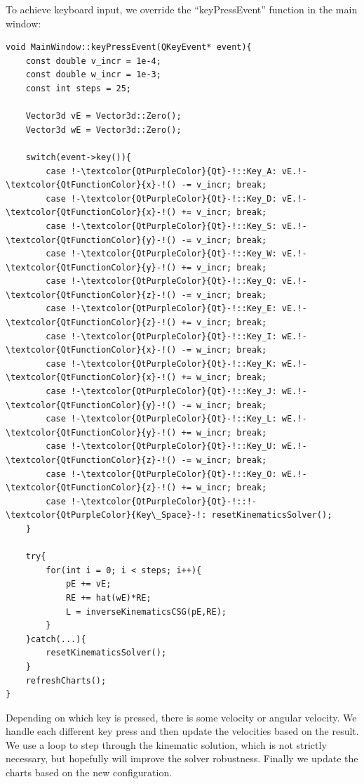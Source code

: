 \documentclass[12pt]{article}
\begin{document}
\noindent To achieve keyboard input, we override the ``keyPressEvent'' function in the main window:
\begin{lstlisting}
void MainWindow::keyPressEvent(QKeyEvent* event){
    const double v_incr = 1e-4;
    const double w_incr = 1e-3;
    const int steps = 25;

    Vector3d vE = Vector3d::Zero();
    Vector3d wE = Vector3d::Zero();

    switch(event->key()){
        case !-\textcolor{QtPurpleColor}{Qt}-!::Key_A: vE.!-\textcolor{QtFunctionColor}{x}-!() -= v_incr; break;
        case !-\textcolor{QtPurpleColor}{Qt}-!::Key_D: vE.!-\textcolor{QtFunctionColor}{x}-!() += v_incr; break;
        case !-\textcolor{QtPurpleColor}{Qt}-!::Key_S: vE.!-\textcolor{QtFunctionColor}{y}-!() -= v_incr; break;
        case !-\textcolor{QtPurpleColor}{Qt}-!::Key_W: vE.!-\textcolor{QtFunctionColor}{y}-!() += v_incr; break;
        case !-\textcolor{QtPurpleColor}{Qt}-!::Key_Q: vE.!-\textcolor{QtFunctionColor}{z}-!() -= v_incr; break;
        case !-\textcolor{QtPurpleColor}{Qt}-!::Key_E: vE.!-\textcolor{QtFunctionColor}{z}-!() += v_incr; break;
        case !-\textcolor{QtPurpleColor}{Qt}-!::Key_I: wE.!-\textcolor{QtFunctionColor}{x}-!() -= w_incr; break;
        case !-\textcolor{QtPurpleColor}{Qt}-!::Key_K: wE.!-\textcolor{QtFunctionColor}{x}-!() += w_incr; break;
        case !-\textcolor{QtPurpleColor}{Qt}-!::Key_J: wE.!-\textcolor{QtFunctionColor}{y}-!() -= w_incr; break;
        case !-\textcolor{QtPurpleColor}{Qt}-!::Key_L: wE.!-\textcolor{QtFunctionColor}{y}-!() += w_incr; break;
        case !-\textcolor{QtPurpleColor}{Qt}-!::Key_U: wE.!-\textcolor{QtFunctionColor}{z}-!() -= w_incr; break;
        case !-\textcolor{QtPurpleColor}{Qt}-!::Key_O: wE.!-\textcolor{QtFunctionColor}{z}-!() += w_incr; break;
        case !-\textcolor{QtPurpleColor}{Qt}-!::!-\textcolor{QtPurpleColor}{Key\_Space}-!: resetKinematicsSolver();
    }

    try{
        for(int i = 0; i < steps; i++){
            pE += vE;
            RE += hat(wE)*RE;
            L = inverseKinematicsCSG(pE,RE);
        }
    }catch(...){
        resetKinematicsSolver();
    }
    refreshCharts();
}
\end{lstlisting}
Depending on which key is pressed, there is some velocity or angular velocity. We handle each different key press and then update the velocities based on the result. We use a loop to step through the kinematic solution, which is not strictly necessary, but hopefully will improve the solver robustness. Finally we update the charts based on the new configuration.
\end{document}

